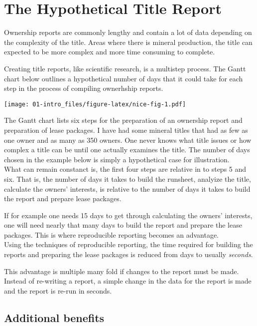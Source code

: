 \documentclass[
]{book}
\theoremstyle{definition}
\theoremstyle{definition}
\theoremstyle{definition}
\theoremstyle{definition}
\theoremstyle{remark}
\begin{document}
\hypertarget{the-hypothetical-title-report}{%
\section{The Hypothetical Title Report}\label{the-hypothetical-title-report}}

Ownership reports are commonly lengthy and contain a lot of data depending on the complexity of the title. Areas where there is mineral production, the title can expected to be more complex and more time consuming to complete.

Creating title reports, like scientific research, is a multistep process. The Gantt chart below outlines a hypothetical number of days that it could take for each step in the process of compiling ownerhship reports.

\texttt{[image: 01-intro\_files/figure-latex/nice-fig-1.pdf]}

The Gantt chart lists six steps for the preparation of an ownership report and preparation of lease packages. I have had some mineral titles that had as few as one owner and as many as 350 owners. One never knows what title issues or how complex a title can be until one actually examines the title. The number of days chosen in the example below is simply a hypothetical case for illustration.\\
What can remain constanct is, the first four steps are relative in to steps 5 and six. That is, the number of days it takes to build the runsheet, analyize the title, calculate the owners' interests, is relative to the number of days it takes to build the report and prepare lease packages.

If for example one needs 15 days to get through calculating the owners' interests, one will need nearly that many days to build the report and prepare the lease packages. This is where reproducible reporting becomes an advantage.\\
Using the techniques of reproducible reporting, the time required for building the reports and preparing the lease packages is reduced from days to usually \emph{seconds}.

This advantage is multiple many fold if changes to the report must be made. Instead of re-writing a report, a simple change in the data for the report is made and the report is re-run in seconds.

\hypertarget{additional-benefits}{%
\subsection{Additional benefits}\label{additional-benefits}}
\end{document}
